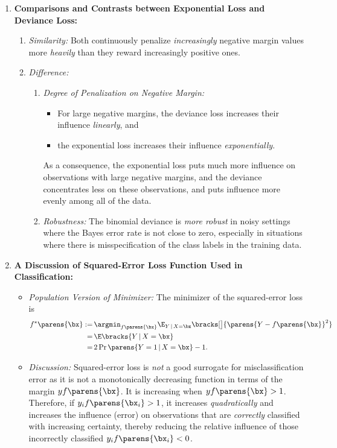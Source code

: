 \documentclass[12pt]{article}
\begin{document}
\begin{enumerate}[label=\textbf{\arabic*.}]
	\item \textbf{Comparisons and Contrasts between Exponential Loss and Deviance Loss:} 
	\begin{enumerate}
		\item \textit{Similarity:} Both continuously penalize \textit{increasingly} negative margin values more \textit{heavily} than they reward increasingly positive ones. 
		\item \textit{Difference:} 
		\begin{enumerate}
			\item \textit{Degree of Penalization on Negative Margin:} 
			\begin{itemize}
				\item For large negative margins, the deviance loss increases their influence \textit{linearly}, and 
				\item the exponential loss increases their influence \textit{exponentially}. 
			\end{itemize}
			As a consequence, the exponential loss puts much more influence on observations with large negative margins, and the deviance concentrates less on these observations, and puts influence more evenly among all of the data. 
			
			\item \textit{Robustness:} The binomial deviance is \emph{more robust} in noisy settings where the Bayes error rate is not close to zero, especially in situations where there is misspecification of the class labels in the training data. 
		\end{enumerate}
	\end{enumerate}
	
	\item \textbf{A Discussion of Squared-Error Loss Function Used in Classification:} 
	\begin{itemize}
		\item \textit{Population Version of Minimizer:} The minimizer of the squared-error loss is 
		\begin{align*}
			f^* \parens{\bx} := & \, \argmin_{f \parens{\bx}} \E_{Y \,\vert\, X = \bx} \bracks[\big]{\parens{Y - f \parens{\bx}}^2} \\ 
			= & \, \E \bracks{Y \,\vert\, X = \bx} \\ 
			= & \, 2 \Pr \parens{Y = 1 \,\vert\, X = \bx} - 1. 
		\end{align*}
		
		\item \textit{Discussion:} Squared-error loss is \textit{not} a good surrogate for misclassification error as it is not a monotonically decreasing function in terms of the margin $yf \parens{\bx}$. It is increasing when $yf\parens{\bx} > 1$. Therefore, if $y_i f \parens{\bx_i} > 1$, it increases \textit{quadratically} and increases the influence (error) on observations that are \emph{correctly} classified with increasing certainty, thereby reducing the relative influence of those incorrectly classified $y_i f \parens{\bx_i} < 0$. 


\end{itemize}
\end{enumerate}
\end{document}
